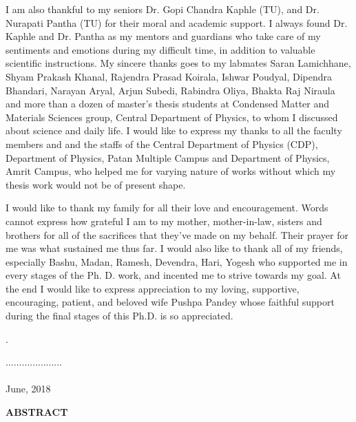 I am also thankful to my seniors Dr. Gopi Chandra Kaphle (TU), and Dr. Nurapati Pantha (TU) for their moral and academic support. I always found Dr. Kaphle and Dr. Pantha as my mentors and guardians  who take care of my sentiments and emotions during my difficult time, in addition to valuable scientific instructions. My sincere thanks goes to my labmates Saran Lamichhane, Shyam Prakash Khanal, Rajendra Prasad Koirala, Ishwar Poudyal, Dipendra Bhandari,  Narayan Aryal, Arjun Subedi, Rabindra Oliya, Bhakta Raj Niraula  and more than a dozen of master's thesis students at Condensed Matter and Materials Sciences group, Central Department of Physics, to whom I discussed about science and daily life. I would like to express my thanks to all the faculty members and and the staffs of the Central Department of Physics (CDP), Department of Physics, Patan Multiple Campus and Department of Physics, Amrit Campus, who helped me for varying nature of works without which my thesis work would not be of present shape.


 I would like to thank my family for all their love and encouragement. Words cannot express how grateful I am to my mother, mother-in-law, sisters and brothers for all of the sacrifices that they've made on my behalf. Their prayer for me was what sustained me thus far. I would also like to thank all of my friends, especially Bashu, Madan, Ramesh, Devendra, Hari, Yogesh who supported me in every stages of the Ph. D. work, and incented me to strive towards my goal. At the end I would like to express appreciation to my loving, supportive, encouraging, patient, and   beloved wife Pushpa Pandey whose faithful support during the final stages of this Ph.D. is so appreciated.

.\vskip 1.0in

\begin{flushright}
$\dots\dots\dots\dots\dots\dots\dots $ \\{}\\
June, 2018 
\end{flushright}
\newpage
{}
{}
\begin{center}
\Large\bf{ABSTRACT}
\end{center}

